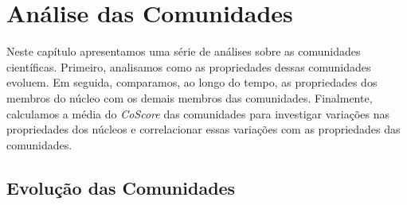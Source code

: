 \chapter{Análise das Comunidades}\label{analise-nucleo-comunidades}

Neste capítulo apresentamos uma série de análises sobre as comunidades científicas. Primeiro, analisamos como as 
propriedades dessas comunidades evoluem. Em seguida, comparamos, ao longo do tempo, as propriedades dos membros do núcleo 
com os demais membros das comunidades. Finalmente, calculamos a média do \textit{CoScore} das comunidades
para investigar variações nas propriedades dos núcleos e correlacionar essas variações com as propriedades das comunidades.


\section{Evolução das Comunidades}\label{sub:evolucao_comunidades_cientifica}

